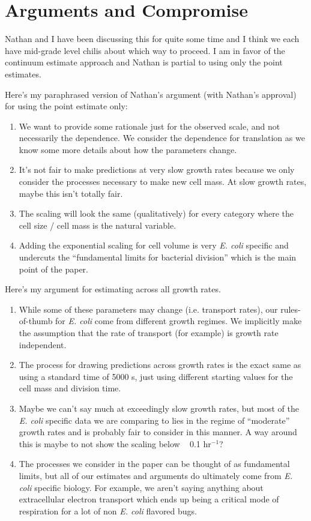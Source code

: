 \documentclass[letterpaper, 10pt]{article}
\begin{document}
\section{Arguments and Compromise}
Nathan and I have been discussing this for quite some time and I think we each
have mid-grade level chilis about which way to proceed. I am in favor of the
continuum estimate approach and Nathan is partial to using only the point
estimates. 

Here’s my paraphrased version of Nathan’s argument (with Nathan’s approval) for
using the point estimate only:
\begin{enumerate}
\item We want to provide some rationale just for the observed scale, and not necessarily the dependence. We consider the dependence for translation as we know some more details about how the parameters change.
\item It’s not fair to make predictions at very slow growth rates because we only consider the processes necessary to make new cell mass. At slow growth rates, maybe this isn’t totally fair.
\item The scaling will look the same (qualitatively) for every category where the cell size / cell mass is the natural variable.
\item Adding the exponential scaling for cell volume is very \textit{E. coli} specific and undercuts the “fundamental limits for bacterial division” which is the main point of the paper.
\end{enumerate}

Here’s my argument for estimating across all growth rates.
\begin{enumerate}
\item While some of these parameters may change (i.e. transport rates), our rules-of-thumb for \textit{E. coli} come from different growth regimes. We implicitly make the assumption that the rate of transport (for example) is growth rate independent.
\item The process for drawing predictions across growth rates is the exact same as using a standard time of 5000 s, just using different starting values for the cell mass and division time.
\item Maybe we can’t say much at exceedingly slow growth rates, but most of the \textit{E. coli} specific data we are comparing to lies in the regime of “moderate” growth rates and is probably fair to consider in this manner. A way around this is maybe to not show the scaling below ~ 0.1 hr$^{-1}$?
\item The processes we consider in the paper can be thought of as fundamental
limits, but all of our estimates and arguments do ultimately come from \textit{E. coli}
specific biology. For example, we aren’t saying anything about extracellular
electron transport which ends up being a critical mode of respiration for a lot
of non \textit{E. coli} flavored bugs.
\end{enumerate}
\end{document}
